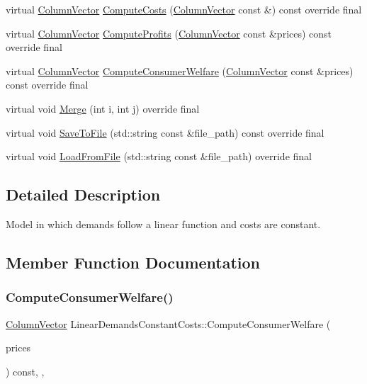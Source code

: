 \begin{DoxyCompactItemize}
\item 
virtual \hyperlink{classColumnVector}{Column\+Vector} \hyperlink{classLinearDemandsConstantCosts_a55e0f15cfc00d8c21fbfd95843c06c44}{Compute\+Costs} (\hyperlink{classColumnVector}{Column\+Vector} const \&) const override final
\item 
virtual \hyperlink{classColumnVector}{Column\+Vector} \hyperlink{classLinearDemandsConstantCosts_a48b52dab01d2cf45beae51eab615f7ae}{Compute\+Profits} (\hyperlink{classColumnVector}{Column\+Vector} const \&prices) const override final
\item 
virtual \hyperlink{classColumnVector}{Column\+Vector} \hyperlink{classLinearDemandsConstantCosts_a9d3fa6a3b151c2f1703f23bbee6954cb}{Compute\+Consumer\+Welfare} (\hyperlink{classColumnVector}{Column\+Vector} const \&prices) const override final
\item 
virtual void \hyperlink{classLinearDemandsConstantCosts_a0ee422d927b5a85f9aba8782b02f537b}{Merge} (int i, int j) override final
\item 
virtual void \hyperlink{classLinearDemandsConstantCosts_aef2823751866a4933a8611dd4622d78b}{Save\+To\+File} (std\+::string const \&file\+\_\+path) const override final
\item 
virtual void \hyperlink{classLinearDemandsConstantCosts_a075add461e368629b9dfd8f72033e2ad}{Load\+From\+File} (std\+::string const \&file\+\_\+path) override final
\end{DoxyCompactItemize}


\subsection{Detailed Description}
Model in which demands follow a linear function and costs are constant. 

\subsection{Member Function Documentation}
\mbox{\label{classLinearDemandsConstantCosts_a9d3fa6a3b151c2f1703f23bbee6954cb}} 
\subsubsection{\texorpdfstring{Compute\+Consumer\+Welfare()}{ComputeConsumerWelfare()}}
{\footnotesize\ttfamily \hyperlink{classColumnVector}{Column\+Vector} Linear\+Demands\+Constant\+Costs\+::\+Compute\+Consumer\+Welfare (\begin{DoxyParamCaption}\item[{\hyperlink{classColumnVector}{Column\+Vector} const \&}]{prices }\end{DoxyParamCaption}) const\hspace{0.3cm}{\ttfamily [final]}, {\ttfamily [override]}, {\ttfamily [virtual]}}

